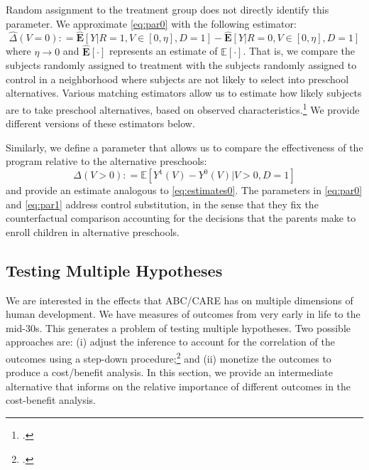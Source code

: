 \noindent Random assignment to the treatment group does not directly identify this parameter. We approximate \eqref{eq:par0} with the following estimator: 
\begin{equation}
\widehat{\Delta} \left(V = 0 \right) : = \widehat{\mathbf{E}} \left[ Y | R = 1, V \in \left[ 0 , \eta \right], D = 1 \right] - \widehat{\mathbf{E}} \left[ Y | R = 0, V \in \left[ 0 , \eta \right], D = 1 \right] \label{eq:estimates0}
\end{equation}
where $\eta \rightarrow 0$ and $\widehat{\mathbf{E}}[\cdot]$ represents an estimate of $\mathbb{E}[\cdot]$. That is, we compare the subjects randomly assigned to treatment with the subjects randomly assigned to control in a neighborhood where subjects are not likely to select into preschool alternatives. Various matching estimators allow us to estimate how likely subjects are to take preschool alternatives, based on observed characteristics.\footnote{\citet{Heckman_Ichimura_etal_1997_REStud,Heckman_Ichimura_etal_1998_REStud}.} We provide different versions of these estimators below.

Similarly, we define a parameter that allows us to compare the effectiveness of the program relative to the alternative preschools:
\begin{equation}
\Delta \left( V > 0 \right) : =   \mathbb{E} \left[ Y^1 \left(V \right) - Y^0 \left( V \right) | V > 0, D = 1 \right] \label{eq:par1}
\end{equation}
and provide an estimate analogous to \eqref{eq:estimates0}. The parameters in \eqref{eq:par0} and \eqref{eq:par1} address control substitution, in the sense that they fix the counterfactual comparison accounting for the decisions that the parents make to enroll children in alternative preschools.

\subsection{Testing Multiple Hypotheses}  \label{section:counts}

We are interested in the effects that ABC/CARE has on multiple dimensions of human development. We have measures of outcomes from very early in life to the mid-30s. This generates a problem of testing multiple hypotheses. Two possible approaches are: (i) adjust the inference to account for the correlation of the outcomes using a step-down procedure;\footnote{\citet{Lehman_Romano_2005_AnnStat,Romano_Shaikh_2006_AnnStat}.} and (ii) monetize the outcomes to produce a cost/benefit analysis. In this section, we provide an intermediate alternative that informs on the relative importance of different outcomes in the cost-benefit analysis.

